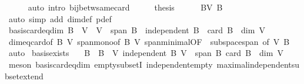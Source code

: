 \begin{isabellebody}
\ \ \ \ \isamarkupfalse%
\ {\isacharparenleft}{\kern0pt}auto\ intro{\isacharcolon}{\kern0pt}\ bij{\isacharunderscore}{\kern0pt}betw{\isacharunderscore}{\kern0pt}same{\isacharunderscore}{\kern0pt}card{\isacharparenright}{\kern0pt}\isanewline
\ \ \isamarkupfalse%
\ \isamarkupfalse%
\ {\isacharquery}{\kern0pt}thesis\isanewline
\ \ \ \ \isamarkupfalse%
\ BV\ B\isanewline
\ \ \ \ \isamarkupfalse%
\ {\isacharparenleft}{\kern0pt}auto\ simp\ add{\isacharcolon}{\kern0pt}\ dim{\isacharunderscore}{\kern0pt}def\ p{\isacharunderscore}{\kern0pt}def{\isacharparenright}{\kern0pt}\isanewline
{}\isamarkupfalse%
%
\endisatagproof
{\isafoldproof}%
%
\isadelimproof
\isanewline
%
\endisadelimproof
\isanewline
{}\isamarkupfalse%
\ basis{\isacharunderscore}{\kern0pt}card{\isacharunderscore}{\kern0pt}eq{\isacharunderscore}{\kern0pt}dim{\isacharcolon}{\kern0pt}\ {\isachardoublequoteopen}B\ {\isasymsubseteq}\ V\ {\isasymLongrightarrow}\ V\ {\isasymsubseteq}\ span\ B\ {\isasymLongrightarrow}\ independent\ B\ {\isasymLongrightarrow}\ card\ B\ {\isacharequal}{\kern0pt}\ dim\ V{\isachardoublequoteclose}\isanewline
%
\isadelimproof
\ \ %
\endisadelimproof
%
\isatagproof
{}\isamarkupfalse%
\ dim{\isacharunderscore}{\kern0pt}eq{\isacharunderscore}{\kern0pt}card{\isacharbrackleft}{\kern0pt}of\ B\ V{\isacharbrackright}{\kern0pt}\ span{\isacharunderscore}{\kern0pt}mono{\isacharbrackleft}{\kern0pt}of\ B\ V{\isacharbrackright}{\kern0pt}\ span{\isacharunderscore}{\kern0pt}minimal{\isacharbrackleft}{\kern0pt}OF\ {\isacharunderscore}{\kern0pt}\ subspace{\isacharunderscore}{\kern0pt}span{\isacharcomma}{\kern0pt}\ of\ V\ B{\isacharbrackright}{\kern0pt}\ \isamarkupfalse%
\ auto%
\endisatagproof
{\isafoldproof}%
%
\isadelimproof
\isanewline
%
\endisadelimproof
\isanewline
{}\isamarkupfalse%
\ basis{\isacharunderscore}{\kern0pt}exists{\isacharcolon}{\kern0pt}\isanewline
\ \ \ B\ \ {\isachardoublequoteopen}B\ {\isasymsubseteq}\ V{\isachardoublequoteclose}\ {\isachardoublequoteopen}independent\ B{\isachardoublequoteclose}\ {\isachardoublequoteopen}V\ {\isasymsubseteq}\ span\ B{\isachardoublequoteclose}\ {\isachardoublequoteopen}card\ B\ {\isacharequal}{\kern0pt}\ dim\ V{\isachardoublequoteclose}\isanewline
%
\isadelimproof
\ \ %
\endisadelimproof
%
\isatagproof
{}\isamarkupfalse%
\ {\isacharparenleft}{\kern0pt}meson\ basis{\isacharunderscore}{\kern0pt}card{\isacharunderscore}{\kern0pt}eq{\isacharunderscore}{\kern0pt}dim\ empty{\isacharunderscore}{\kern0pt}subsetI\ independent{\isacharunderscore}{\kern0pt}empty\ maximal{\isacharunderscore}{\kern0pt}independent{\isacharunderscore}{\kern0pt}subset{\isacharunderscore}{\kern0pt}extend{\isacharparenright}{\kern0pt}%

\end{isabellebody}
